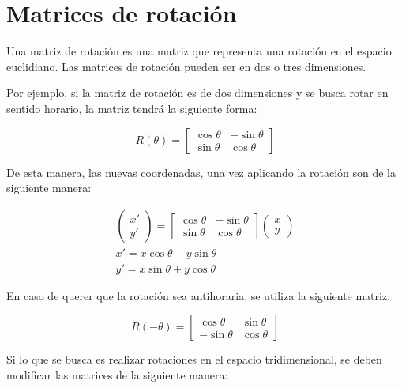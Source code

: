
\section{Matrices de rotaci\'on}
Una matriz de rotaci\'on es una matriz que representa una rotaci\'on en el
espacio euclidiano. Las matrices de rotaci\'on pueden ser en dos o tres
dimensiones.
	
Por ejemplo, si la matriz de rotaci\'on es de dos dimensiones y se busca rotar
en sentido horario, la matriz tendrá la siguiente forma:

\begin{equation}
	R(\theta)=
	\begin{bmatrix}
		\cos \theta & -\sin \theta\\
		\sin \theta & \cos \theta
	\end{bmatrix}
\end{equation}

De esta manera, las nuevas coordenadas, una vez aplicando la rotación son de la
siguiente manera:

\begin{eqnarray}
	\left(
	\begin{matrix}
		x'\\
		y'
	\end{matrix}
	\right)
	=
	\begin{bmatrix}
		\cos \theta & -\sin \theta\\
		\sin \theta & \cos \theta
	\end{bmatrix}
	\left(
	\begin{matrix}
		x\\
		y
	\end{matrix}
	\right)\\
	x'=x\cos \theta -y\sin \theta\\
	y'=x\sin \theta + y \cos \theta
\end{eqnarray}

En caso de querer que la rotación sea antihoraria, se utiliza la siguiente
matriz:

\begin{equation}
	R(-\theta)=
	\begin{bmatrix}
		\cos \theta & \sin \theta\\
		-\sin \theta & \cos \theta
	\end{bmatrix}
\end{equation}

Si lo que se busca es realizar rotaciones en el espacio tridimensional, se deben
modificar las matrices de la siguiente manera:

